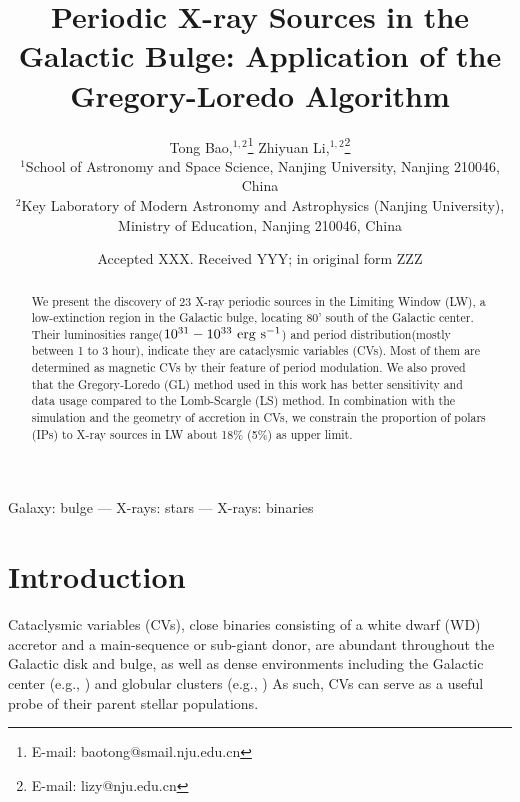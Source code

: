 \documentclass[fleqn,usenatbib]{mnras}
\title[Periodic X-ray Sources in the Galactic Bulge]{Periodic X-ray Sources in the Galactic Bulge: Application of the Gregory-Loredo Algorithm}
\author[Bao \& Li]{
Tong Bao,$^{1,2}$\thanks{E-mail: baotong@smail.nju.edu.cn}
Zhiyuan Li,$^{1,2}$\thanks{E-mail: lizy@nju.edu.cn}
\\
$^{1}$School of Astronomy and Space Science, Nanjing University, Nanjing 210046, China\\
$^{2}$Key Laboratory of Modern Astronomy and Astrophysics (Nanjing University), Ministry of Education, Nanjing 210046, China
}
\date{Accepted XXX. Received YYY; in original form ZZZ}
\begin{document}
\maketitle
\begin{abstract}
We present the discovery of 23 X-ray periodic sources in the Limiting Window (LW), a low-extinction region in the Galactic bulge, locating 80' south of the Galactic center. Their luminosities range(${\rm 10^{31}-10^{33} ~erg ~ s^{-1}}$) and period distribution(mostly between 1 to 3 hour), indicate they are cataclysmic variables (CVs). Most of them are determined as magnetic CVs by their feature of period modulation. 
We also proved that the Gregory-Loredo (GL) method used in this work has better sensitivity and data usage compared to the Lomb-Scargle (LS) method. In combination with the simulation and the geometry of accretion in CVs, we constrain the proportion of polars (IPs) to X-ray sources in LW about 18\% (5\%) as upper limit. 
\end{abstract}

\begin{keywords}
Galaxy: bulge --- X-rays: stars --- X-rays: binaries
\end{keywords}

\section{Introduction} \label{sec:intro}
Cataclysmic variables (CVs), close binaries consisting of a white dwarf (WD) accretor and a main-sequence or sub-giant donor,
are abundant throughout the Galactic disk and bulge, as well as dense environments including the Galactic center (e.g., \citealp{2003ApJ...599..465M,2009ApJS..181..110M,2018ApJS..235...26Z}) and globular clusters (e.g., \citealp{2006ApJ...646L.143P,2018ApJ...858...33C}) 
As such, CVs can serve as a useful probe of their parent stellar populations.
\end{document}
